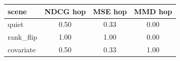 \begin{tabular}{@{}lccc@{}}
\toprule
scene & NDCG hop & MSE hop & MMD hop \\
\midrule
quiet & 0.50 & 0.33 & 0.00 \\
rank_flip & 1.00 & 1.00 & 0.00 \\
covariate & 0.50 & 0.33 & 1.00 \\
\bottomrule
\end{tabular}